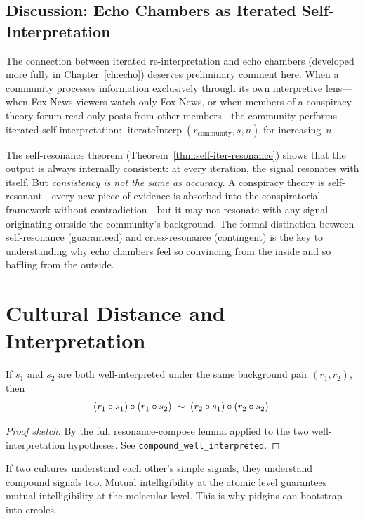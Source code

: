 \subsection*{Discussion: Echo Chambers as Iterated Self-Interpretation}

The connection between iterated re-interpretation and echo chambers
(developed more fully in Chapter~\ref{ch:echo}) deserves preliminary
comment here.  When a community processes information exclusively
through its own interpretive lens---when Fox News viewers watch only Fox
News, or when members of a conspiracy-theory forum read only posts from
other members---the community performs iterated self-interpretation:
$\operatorname{iterateInterp}(r_{\mathrm{community}}, s, n)$ for
increasing~$n$.

The self-resonance theorem (Theorem~\ref{thm:self-iter-resonance}) shows
that the output is always internally consistent: at every iteration, the
signal resonates with itself.  But \emph{consistency is not the same as
accuracy}.  A conspiracy theory is self-resonant---every new piece of
evidence is absorbed into the conspiratorial framework without
contradiction---but it may not resonate with any signal originating
outside the community's background.  The formal distinction between
self-resonance (guaranteed) and cross-resonance (contingent) is the key
to understanding why echo chambers feel so convincing from the inside
and so baffling from the outside.

\section{Cultural Distance and Interpretation}
\label{sec:ch5:distance}

\begin{theorem}
\label{thm:compound-well-interpreted}
If $s_1$ and $s_2$ are both well-interpreted under the same background
pair $(r_1, r_2)$, then
\[
  (r_1 \circ s_1) \circ (r_1 \circ s_2)
  \;\sim\;
  (r_2 \circ s_1) \circ (r_2 \circ s_2).
\]
\end{theorem}

\begin{proof}[Proof sketch]
By the full resonance-compose lemma applied to the two well-interpretation
hypotheses.
See \texttt{compound\_well\_interpreted}.
\end{proof}

\begin{remark}
If two cultures understand each other's simple signals, they understand
compound signals too.  Mutual intelligibility at the atomic level
guarantees mutual intelligibility at the molecular level.  This is why
pidgins can bootstrap into creoles.
\end{remark}

